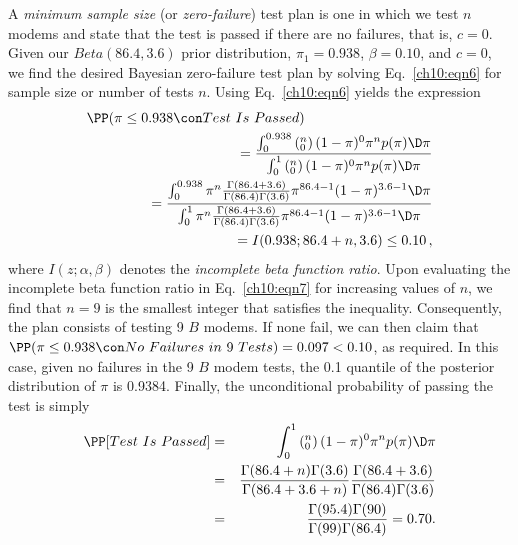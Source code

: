 \documentclass {book}
\begin{document}
\begin{sidebar}
A \emph{minimum sample size} (or \emph{zero-failure}) test plan is
one in which we test $n$ modems and state that the test is passed
if there are no failures, that is, $c = 0$. Given our
$Beta(86.4,3.6)$ prior distribution, $\pi_1 = 0.938$, $\beta =
0.10$, and $c = 0$, we find the desired Bayesian zero-failure test
plan by solving Eq.~\ref{ch10:eqn6} for sample size or number of
tests $n$. Using Eq.~\ref{ch10:eqn6} yields the expression
\begin{eqnarray}\label{ch10:eqn7}
\lefteqn{\PP(\pi \leq 0.938 \con Test\mbox{ }Is\mbox{ }Passed)}\hspace{0.5in}\\
& & = \frac
{\int^{0.938}_{0}\left(_0^n\right)(1-\pi)^{0}\pi^{n}p(\pi) \D
\pi}{\int^{1}_{0} \left(_0^n\right)(1-\pi)^{0}\pi^{n}
p(\pi) \D \pi}\nonumber\\
& & = \frac {\int^{0.938}_{0}
\pi^{n}\frac{\Gamma(86.4+3.6)}{\Gamma(86.4)\Gamma(3.6)}
\pi^{86.4-1}(1-\pi)^{3.6-1} \D \pi}{\int^{1}_{0}
\pi^{n}\frac{\Gamma(86.4 + 3.6)}{\Gamma(86.4)\Gamma(3.6)}
\pi^{86.4-1}(1-\pi)^{3.6-1} \D \pi} \nonumber \\
& & = I(0.938;86.4 + n, 3.6) \leq 0.10 \, ,\nonumber
\end{eqnarray}
where $I(z; \alpha, \beta)$ denotes the \emph{incomplete beta
function ratio}. Upon
evaluating the incomplete beta function ratio in
Eq.~\ref{ch10:eqn7} for increasing values of $n$, we find that $n
= 9$ is the smallest integer that satisfies the inequality.
Consequently, the plan consists of testing 9 $B$ modems. If none
fail, we can then claim that $\PP(\pi \leq 0.938 \con No\mbox{
}Failures\mbox{ }in\mbox{ }9\mbox{ }Tests) = 0.097 < 0.10$, as
required. In this case, given no failures in the 9 $B$ modem
tests, the 0.1 quantile of the posterior distribution of $\pi$ is
0.9384. Finally, the unconditional probability of passing the test
is simply
\begin{eqnarray*}
\PP[ Test\mbox{ }Is\mbox{ }Passed] & = & {\int^{1}_{0}
\left(_0^n\right)(1-\pi)^{0}\pi^{n}
p(\pi) \D \pi}\\
& =  & \frac{\Gamma(86.4+n)\Gamma(3.6)}{\Gamma(86.4+3.6+n)}
\frac{\Gamma(86.4+3.6)}{\Gamma(86.4)\Gamma(3.6)}\\
& = & \frac{\Gamma(95.4)\Gamma(90)}{\Gamma(99)\Gamma(86.4)} = 0.70. \\
\end{eqnarray*}
\end{sidebar}
\end{document}
